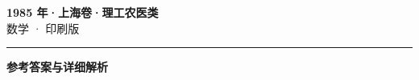 \documentclass[zihao=5, a4paper]{ctexart}
\begin{document}
\begin{center}
  {\Large\bfseries 1985 年·上海卷·理工农医类}\\[4pt]
  {\large 数学 · 印刷版}
\end{center}
\medskip
{}

\par\bigskip\hrule\bigskip
{}
\begin{center}{\large\bfseries 参考答案与详细解析}\end{center}
\smallskip

\end{document}

